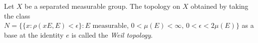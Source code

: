 Let $X$ be a separated measurable group. The topology on $X$ obtained by taking the class $N = \{\{x : \rho(xE, E) < \epsilon\} : \text{$E$ measurable, $0 < \mu(E) < \infty$, $0 < \epsilon < 2\mu(E)$}\}$ as a base at the identity $e$ is called the \emph{Weil topology}.
